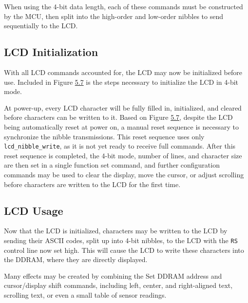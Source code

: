 \documentclass[
  9pt,
  letterpaper,
  abstract,
  titlepage]{scrbook}
\begin{document}
When using the 4-bit data length, each of these commands must be
constructed by the MCU, then split into the high-order and low-order
nibbles to send sequentially to the LCD.

\subsection{LCD Initialization}\label{lcd-initialization}

With all LCD commands accounted for, the LCD may now be initialized
before use. Included in Figure \hyperref[fig:lcdinitialization]{5.7} is
the steps necessary to initialize the LCD in 4-bit mode.

At power-up, every LCD character will be fully filled in, initialized,
and cleared before characters can be written to it. Based on Figure
\hyperref[fig:lcdinitialization]{5.7}, despite the LCD being
automatically reset at power on, a manual reset sequence is necessary to
synchronize the nibble transmissions. This reset sequence uses only
\texttt{lcd\_nibble\_write}, as it is not yet ready to receive full
commands. After this reset sequence is completed, the 4-bit mode, number
of lines, and character size are then set in a single function set
command, and further configuration commands may be used to clear the
display, move the cursor, or adjust scrolling before characters are
written to the LCD for the first time.

\subsection{LCD Usage}\label{lcd-usage}

Now that the LCD is initialized, characters may be written to the LCD by
sending their ASCII codes, split up into 4-bit nibbles, to the LCD with
the \texttt{RS} control line now set high. This will cause the LCD to
write these characters into the DDRAM, where they are directly
displayed.

Many effects may be created by combining the Set DDRAM address and
cursor/display shift commands, including left, center, and right-aligned
text, scrolling text, or even a small table of sensor readings.
\end{document}
